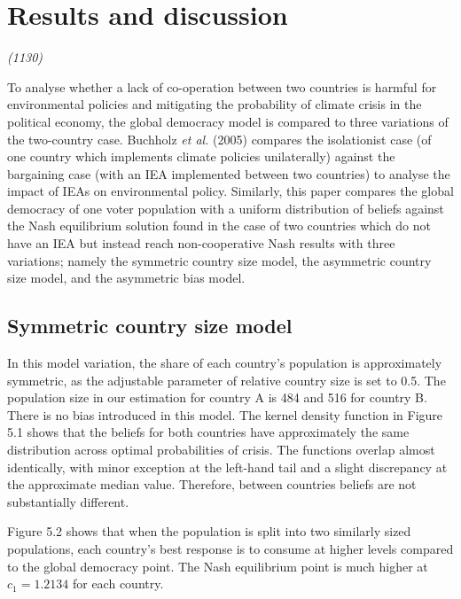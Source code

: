 \documentclass[11pt,preprint, authoryear]{elsarticle}
\numberwithin{equation}{section}
\numberwithin{figure}{section}
\numberwithin{table}{section}
\begin{document}
\hypertarget{results-and-discussion}{%
\section{Results and discussion}\label{results-and-discussion}}

\emph{(1130)}

To analyse whether a lack of co-operation between two countries is
harmful for environmental policies and mitigating the probability of
climate crisis in the political economy, the global democracy model is
compared to three variations of the two-country case. Buchholz \emph{et
al.} (2005) compares the isolationist case (of one country which
implements climate policies unilaterally) against the bargaining case
(with an IEA implemented between two countries) to analyse the impact of
IEAs on environmental policy. Similarly, this paper compares the global
democracy of one voter population with a uniform distribution of beliefs
against the Nash equilibrium solution found in the case of two countries
which do not have an IEA but instead reach non-cooperative Nash results
with three variations; namely the symmetric country size model, the
asymmetric country size model, and the asymmetric bias model.

\hypertarget{symmetric-country-size-model}{%
\subsection{Symmetric country size
model}\label{symmetric-country-size-model}}

In this model variation, the share of each country's population is
approximately symmetric, as the adjustable parameter of relative country
size is set to 0.5. The population size in our estimation for country A
is 484 and 516 for country B. There is no bias introduced in this model.
The kernel density function in Figure 5.1 shows that the beliefs for
both countries have approximately the same distribution across optimal
probabilities of crisis. The functions overlap almost identically, with
minor exception at the left-hand tail and a slight discrepancy at the
approximate median value. Therefore, between countries beliefs are not
substantially different.

Figure 5.2 shows that when the population is split into two similarly
sized populations, each country's best response is to consume at higher
levels compared to the global democracy point. The Nash equilibrium
point is much higher at \(c_1=1.2134\) for each country.
\end{document}
